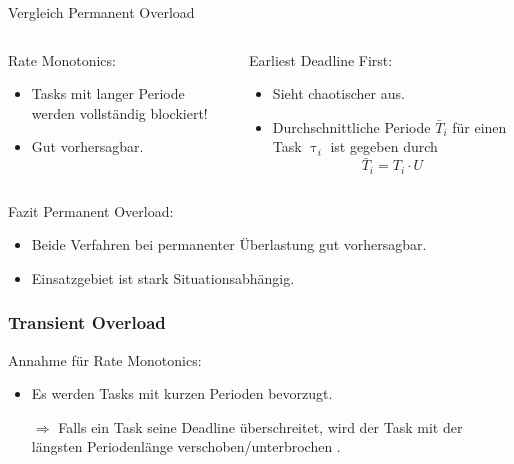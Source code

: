 \begin{frame}{Vergleich Permanent Overload}
	\begin{columns}[]
  			\begin{column}{0.5\textwidth}
				Rate Monotonics:
				\begin{itemize}
					\item Tasks mit langer Periode werden vollständig blockiert!
					\item Gut vorhersagbar.
				\end{itemize}

			\end{column}
  			\begin{column}{0.5\textwidth}
  				Earliest Deadline First:
				\begin{itemize}
					\item Sieht chaotischer aus.
					\item Durchschnittliche Periode $\bar{T}_i$ für einen Task $\uptau_i$ ist gegeben durch
						\begin{equation}
							\bar{T}_i=T_i\cdot U
						\end{equation}
				\end{itemize}	
  			\end{column}
	\end{columns}
\end{frame}


\begin{frame}{Fazit Permanent Overload:}
	
	\begin{itemize}
		\item Beide Verfahren bei permanenter Überlastung gut vorhersagbar.
		\item Einsatzgebiet ist stark Situationsabhängig.
	\end{itemize}
\end{frame}

\subsubsection{Transient Overload}
\begin{frame}{Annahme für Rate Monotonics:}
	\begin{itemize}
		\item Es werden Tasks mit kurzen Perioden bevorzugt.\pause
		\item[$\Rightarrow$] Falls ein Task seine Deadline überschreitet, wird der Task mit der längsten Periodenlänge verschoben/unterbrochen	.
	\end{itemize}
\end{frame}

